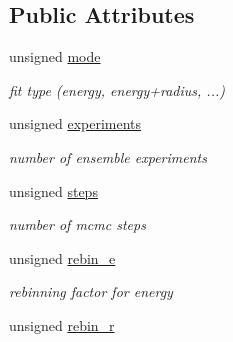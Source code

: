 \subsection*{Public Attributes}
\begin{DoxyCompactItemize}
\item 
\hypertarget{classFitConfig_a1c92272eb2295a68c973ee826c803515}{
unsigned \hyperlink{classFitConfig_a1c92272eb2295a68c973ee826c803515}{mode}}
\label{classFitConfig_a1c92272eb2295a68c973ee826c803515}

\begin{DoxyCompactList}\small\item\em fit type (energy, energy+radius, ...) \item\end{DoxyCompactList}\item 
\hypertarget{classFitConfig_a66991d2653fba1bfa8e1103d45682958}{
unsigned \hyperlink{classFitConfig_a66991d2653fba1bfa8e1103d45682958}{experiments}}
\label{classFitConfig_a66991d2653fba1bfa8e1103d45682958}

\begin{DoxyCompactList}\small\item\em number of ensemble experiments \item\end{DoxyCompactList}\item 
\hypertarget{classFitConfig_aad06a178eacc7b1b88d929a9e562c05e}{
unsigned \hyperlink{classFitConfig_aad06a178eacc7b1b88d929a9e562c05e}{steps}}
\label{classFitConfig_aad06a178eacc7b1b88d929a9e562c05e}

\begin{DoxyCompactList}\small\item\em number of mcmc steps \item\end{DoxyCompactList}\item 
\hypertarget{classFitConfig_a3255d0a1bbe18e6748576c0ce7ee16f7}{
unsigned \hyperlink{classFitConfig_a3255d0a1bbe18e6748576c0ce7ee16f7}{rebin\_\-e}}
\label{classFitConfig_a3255d0a1bbe18e6748576c0ce7ee16f7}

\begin{DoxyCompactList}\small\item\em rebinning factor for energy \item\end{DoxyCompactList}\item 
\hypertarget{classFitConfig_acb53fa7cd68827ac4a430cc8b63070d3}{
unsigned \hyperlink{classFitConfig_acb53fa7cd68827ac4a430cc8b63070d3}{rebin\_\-r}}
\label{classFitConfig_acb53fa7cd68827ac4a430cc8b63070d3}


\end{DoxyCompactItemize}
